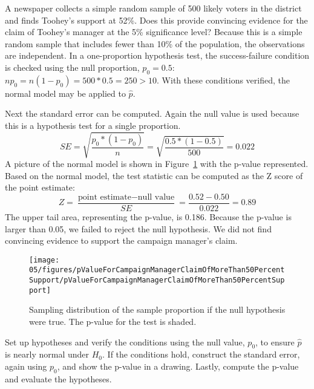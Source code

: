 \begin{example}{A newspaper collects a simple random sample of 500 likely voters in the district and finds Toohey's support at 52\%. Does this provide convincing evidence for the claim of Toohey's manager at the 5\% significance level?}
Because this is a simple random sample that includes fewer than 10\% of the population, the observations are independent. In a one-proportion hypothesis test, the success-failure condition is checked using the null proportion, $p_0=0.5$: $np_0 = n(1-p_0) = 500*0.5 = 250 > 10$. With these conditions verified, the normal model may be applied to $\hat{p}$.

Next the standard error can be computed. Again the null value is used because this is a hypothesis test for a single proportion.
$$SE = \sqrt{\frac{p_0*(1-p_0)}{n}} = \sqrt{\frac{0.5*(1-0.5)}{500}} = 0.022$$
A picture of the normal model is shown in Figure~\ref{pValueForCampaignManagerClaimOfMoreThan50PercentSupport} with the p-value represented. Based on the normal model, the test statistic can be computed as the Z score of the point estimate:
$$Z = \frac{\text{point estimate} - \text{null value}}{SE} = \frac{0.52 - 0.50}{0.022} = 0.89$$
The upper tail area, representing the p-value, is 0.186. Because the p-value is larger than 0.05, we failed to reject the null hypothesis. We did not find convincing evidence to support the campaign manager's claim.
\end{example}
\begin{figure}[hht]
\centering

\vspace{-2.5mm}

\texttt{[image: 05/figures/pValueForCampaignManagerClaimOfMoreThan50PercentSupport/pValueForCampaignManagerClaimOfMoreThan50PercentSupport]}
\caption{Sampling distribution of the sample proportion if the null hypothesis were true. The p-value for the test is shaded.}
\label{pValueForCampaignManagerClaimOfMoreThan50PercentSupport}
\end{figure}

\vspace{-3mm}

\begin{termBox}{
Set up hypotheses and verify the conditions using the null value, $p_0$, to ensure $\hat{p}$ is nearly normal under $H_0$. If the conditions hold, construct the standard error, again using $p_0$, and show the p-value in a drawing. Lastly, compute the p-value and evaluate the hypotheses.}
\end{termBox}

